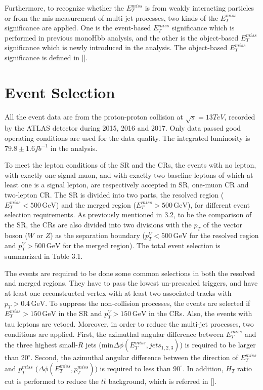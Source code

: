 \documentclass[class=NTHU_thesis, crop=false]{standalone}
\begin{document}
Furthermore, to recognize whether the $E^{miss}_T$ is from weakly interacting particles or from the mis-measurement of multi-jet processes, two kinds of the $E^{miss}_T$ significance are applied. One is the event-based $E^{miss}_T$ significance which is performed in previous monoHbb analysis, and the other is the object-based $E^{miss}_T$ significance which is newly introduced in the analysis. The object-based $E^{miss}_T$ significance is defined in [].

\section{Event Selection}
All the event data are from the proton-proton collision at $\sqrt{s} = 13 TeV$, recorded by the ATLAS detector during 2015, 2016 and 2017. Only data passed good operating conditions are used for the data quality. The integrated luminosity is $79.8 \pm 1.6 fb^{-1}$ in the analysis.

To meet the lepton conditions of the SR and the CRs, the events with no lepton, with exactly one signal muon, and with exactly two baseline leptons of which at least one is a signal lepton, are respectively accepted in SR, one-muon CR and two-lepton CR. The SR is divided into two parts, the resolved region ($E^{miss}_T < 500\, \mathrm{GeV}$) and the merged region ($E^{miss}_T > 500\, \mathrm{GeV}$), for different event selection requirements. As previously mentioned in 3.2, to be the comparison of the SR, the CRs are also divided into two divisions with the $p_T$ of the vector boson ($W$ or $Z$) as the separation boundary ($p^V_T < 500\, \mathrm{GeV}$ for the resolved region and $p^V_T > 500\, \mathrm{GeV}$ for the merged region). The total event selection is summarized in Table 3.1.

The events are required to be done some common selections in both the resolved and merged regions. They have to pass the lowest un-prescaled triggers, and have at least one reconstructed vertex with at least two associated tracks with $p_T > 0.4\, \mathrm{GeV}$. To suppress the non-collision processes, the events are selected if $E^{miss}_T > 150\, \mathrm{GeV}$ in the SR and $p^V_T > 150\, \mathrm{GeV}$ in the CRs. Also, the events with tau leptons are vetoed. Moreover, in order to reduce the multi-jet processes, two conditions are applied. First, the azimuthal angular difference between $E^{miss}_T$ and the three highest small-$R$ jets (min$\Delta\phi(E^{miss}_T, jets_{1, 2, 3})$) is required to be larger than $20^\circ$. Second, the azimuthal angular difference between the direction of $E^{miss}_T$ and $p^{miss}_T$ ($\Delta\phi(E^{miss}_T, p^{miss}_T)$) is required to less than $90^\circ$. In addition, $H_T$ ratio cut is performed to reduce the $t\bar{t}$ background, which is referred in [].
\end{document}
